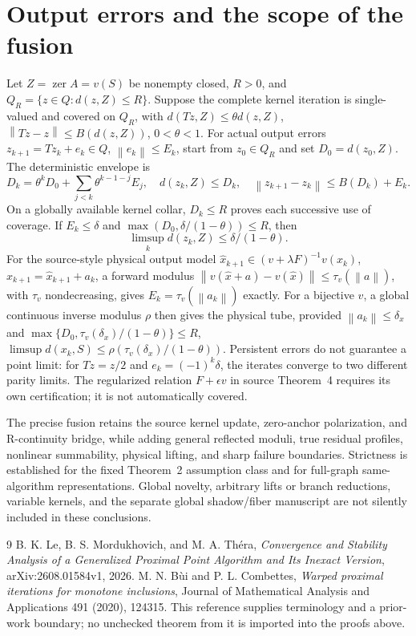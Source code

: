\documentclass[11pt]{article}
\newcommand{\norm}[1]{\left\lVert#1\right\rVert}
\newcommand{\zer}{\operatorname{zer}}
\theoremstyle{remark}
\begin{document}
\section{Output errors and the scope of the fusion}
Let $Z=\zer A=v(S)$ be nonempty closed, $R>0$, and
$Q_R=\{z\in Q:d(z,Z)\le R\}$. Suppose the complete kernel iteration
is single-valued and covered on $Q_R$, with
$d(Tz,Z)\le\theta d(z,Z)$, $\norm{Tz-z}\le B(d(z,Z))$, $0<\theta<1$.
For actual output errors $z_{k+1}=Tz_k+e_k\in Q$, $\norm{e_k}\le E_k$,
start from $z_0\in Q_R$ and set $D_0=d(z_0,Z)$. The deterministic envelope is
\begin{equation}
 D_k=\theta^kD_0+\sum_{j<k}\theta^{k-1-j}E_j,
 \quad d(z_k,Z)\le D_k,\quad
 \norm{z_{k+1}-z_k}\le B(D_k)+E_k.
\end{equation}
On a globally available kernel collar, $D_k\le R$ proves each
successive use of coverage. If $E_k\le\delta$ and
$\max(D_0,\delta/(1-\theta))\le R$, then
\begin{equation}
 \limsup_k d(z_k,Z)\le\delta/(1-\theta).
\end{equation}
For the source-style physical output model
$\widehat x_{k+1}\in(v+\lambda F)^{-1}v(x_k)$,
$x_{k+1}=\widehat x_{k+1}+a_k$, a forward modulus
$\norm{v(\widehat x+a)-v(\widehat x)}\le\tau_v(\norm a)$, with
$\tau_v$ nondecreasing, gives
$E_k=\tau_v(\norm{a_k})$ exactly. For a bijective $v$, a global continuous inverse
modulus $\rho$ then gives the physical tube, provided
$\norm{a_k}\le\delta_x$ and
$\max\{D_0,\tau_v(\delta_x)/(1-\theta)\}\le R$,
$\limsup d(x_k,S)\le\rho(\tau_v(\delta_x)/(1-\theta))$.
Persistent errors do not guarantee a point limit: for $Tz=z/2$ and
$e_k=(-1)^k\delta$, the iterates converge to two different parity
limits. The regularized relation $F+\epsilon v$ in source Theorem~4
requires its own certification; it is not automatically covered.

The precise fusion retains the source kernel update, zero-anchor
polarization, and R-continuity bridge, while adding general reflected
moduli, true residual profiles, nonlinear summability, physical lifting,
and sharp failure boundaries. Strictness is established for the fixed
Theorem~2 assumption class and for full-graph same-algorithm
representations. Global novelty, arbitrary lifts or branch reductions,
variable kernels, and the separate global shadow/fiber manuscript are
not silently included in these conclusions.

\begin{thebibliography}{9}
 B. K. Le, B. S. Mordukhovich, and M. A. Th\'era,
\emph{Convergence and Stability Analysis of a Generalized Proximal Point
Algorithm and Its Inexact Version}, arXiv:2608.01584v1, 2026.
 M. N. B\`ui and P. L. Combettes,
\emph{Warped proximal iterations for monotone inclusions},
Journal of Mathematical Analysis and Applications 491 (2020), 124315.
This reference supplies terminology and a prior-work boundary; no
unchecked theorem from it is imported into the proofs above.
\end{thebibliography}
\end{document}
